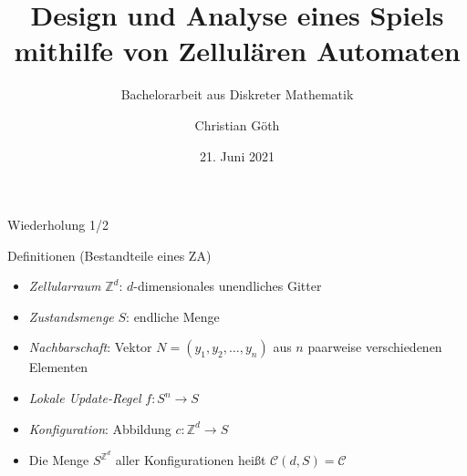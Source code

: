 \documentclass[aspectratio=169]{beamer}
\title[Zelluläre Automaten]{Design und Analyse eines Spiels \newline mithilfe von Zellulären Automaten}
\subtitle{Bachelorarbeit aus Diskreter Mathematik}
\author[C. Göth]{Christian Göth}
\institute[TU Wien]{TU Wien, Vienna, Austria}
\date{21. Juni 2021}
\begin{document}
\begin{frame}
    \titlepage
\end{frame}



  \begin{frame}{Wiederholung 1/2}
    \begin{block}{Definitionen (Bestandteile eines ZA)}
      \begin{itemize}
        \item \textit{Zellularraum} $\mathbb{Z}^{d}$: $d$-dimensionales unendliches Gitter
        \item \textit{Zustandsmenge} $S$: endliche Menge
        \item \textit{Nachbarschaft}: Vektor $N = (y_1,y_2,\dots,y_n)$ aus $n$ paarweise verschiedenen Elementen
        \item \textit{Lokale Update-Regel} $f: S^n \to S$
      \end{itemize}
    \end{block}

    \pause

    \begin{definition*}
      \begin{itemize}
        \item \textit{Konfiguration}: Abbildung $c: \mathbb{Z}^{d} \to S$
        \item Die Menge $S^{\mathbb{Z}^{d}}$ aller Konfigurationen heißt $\mathcal{C}(d,S) = \mathcal{C}$
      \end{itemize}
    \end{definition*}
  \end{frame}
\end{document}
